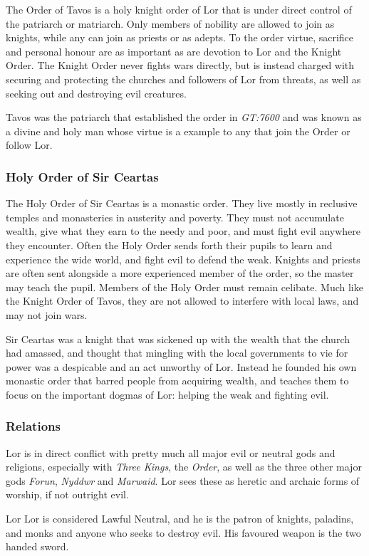 The Order of Tavos is a holy knight order of Lor that is under direct control
of the patriarch or matriarch. Only members of nobility are allowed to join as
knights, while any can join as priests or as adepts. To the order virtue,
sacrifice and personal honour are as important as are devotion to Lor and the
Knight Order. The Knight Order never fights wars directly, but is instead
charged with securing and protecting the churches and followers of Lor from
threats, as well as seeking out and destroying evil creatures.

Tavos was the patriarch that established the order in \emph{GT:7600} and was
known as a divine and holy man whose virtue is a example to any that join
the Order or follow Lor.

\subsubsection*{Holy Order of Sir Ceartas}
\label{sec:Holy Order of Sir Ceartas}

The Holy Order of Sir Ceartas is a monastic order. They live mostly in
reclusive temples and monasteries in austerity and poverty. They must not
accumulate wealth, give what they earn to the needy and poor, and must fight
evil anywhere they encounter. Often the Holy Order sends forth their pupils to
learn and experience the wide world, and fight evil to defend the
weak. Knights and priests are often sent alongside a more experienced member
of the order, so the master may teach the pupil. Members of the Holy Order
must remain celibate. Much like the Knight Order of Tavos, they are not
allowed to interfere with local laws, and may not join wars.

Sir Ceartas was a knight that was sickened up with the wealth that the church
had amassed, and thought that mingling with the local governments to vie for
power was a despicable and an act unworthy of Lor. Instead he founded his own
monastic order that barred people from acquiring wealth, and teaches them to
focus on the important dogmas of Lor: helping the weak and fighting evil.

\subsubsection*{Relations}

Lor is in direct conflict with pretty much all major evil or neutral gods and
religions, especially with \emph{Three Kings}, the \emph{Order}, as well as
the three other major gods \emph{Forun}, \emph{Nyddwr} and \emph{Marwaid}. Lor
sees these as heretic and archaic forms of worship, if not outright evil.

\begin{35e}{Lor}
  Lor is considered Lawful Neutral, and he is the patron of knights, paladins,
  and monks and anyone who seeks to destroy evil. His favoured weapon is the
  two handed sword.
\end{35e}
